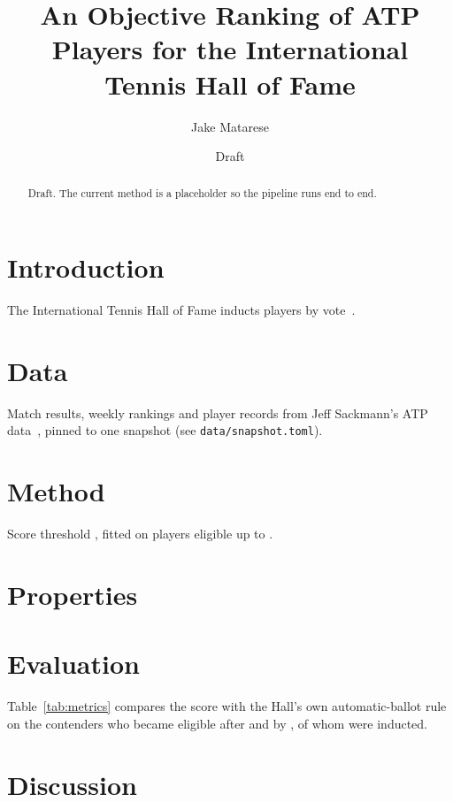 \documentclass[11pt]{article}
\title{An Objective Ranking of ATP Players for the International Tennis Hall of Fame}
\author{Jake Matarese}
\date{Draft}
\begin{document}
\maketitle

\begin{abstract}
Draft. The current method is a placeholder so the pipeline runs end to end.
\end{abstract}

\section{Introduction}
The International Tennis Hall of Fame inducts players by vote~\citep{ithf}.

\section{Data}
Match results, weekly rankings and player records from Jeff Sackmann's ATP
data~\citep{sackmann}, pinned to one snapshot (see \texttt{data/snapshot.toml}).

\section{Method}
Score threshold \Threshold, fitted on players eligible up to \SplitYear.

\section{Properties}

\section{Evaluation}
Table~\ref{tab:metrics} compares the score with the Hall's own automatic-ballot
rule on the \TestPlayers{} contenders who became eligible after \SplitYear{} and by \AsOf{}, of
whom \TestInducted{} were inducted.

\begin{table}[h]
\centering
\MetricsTable
\caption{Agreement with real inductions on held-out years.}
\label{tab:metrics}
\end{table}

\begin{table}[h]
\centering
\small
\TopTable
\caption{The fifteen highest career scores.}
\label{tab:top}
\end{table}

\section{Discussion}



\end{document}
